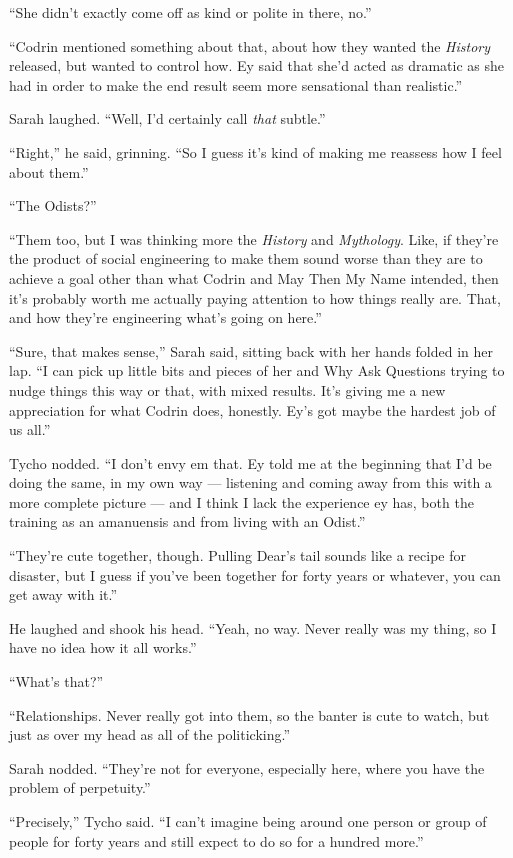 ``She didn't exactly come off as kind or polite in there, no.''

``Codrin mentioned something about that, about how they wanted the \emph{History} released, but wanted to control how. Ey said that she'd acted as dramatic as she had in order to make the end result seem more sensational than realistic.''

Sarah laughed. ``Well, I'd certainly call \emph{that} subtle.''

``Right,'' he said, grinning. ``So I guess it's kind of making me reassess how I feel about them.''

``The Odists?''

``Them too, but I was thinking more the \emph{History} and \emph{Mythology}. Like, if they're the product of social engineering to make them sound worse than they are to achieve a goal other than what Codrin and May Then My Name intended, then it's probably worth me actually paying attention to how things really are. That, and how they're engineering what's going on here.''

``Sure, that makes sense,'' Sarah said, sitting back with her hands folded in her lap. ``I can pick up little bits and pieces of her and Why Ask Questions trying to nudge things this way or that, with mixed results. It's giving me a new appreciation for what Codrin does, honestly. Ey's got maybe the hardest job of us all.''

Tycho nodded. ``I don't envy em that. Ey told me at the beginning that I'd be doing the same, in my own way — listening and coming away from this with a more complete picture — and I think I lack the experience ey has, both the training as an amanuensis and from living with an Odist.''

``They're cute together, though. Pulling Dear's tail sounds like a recipe for disaster, but I guess if you've been together for forty years or whatever, you can get away with it.''

He laughed and shook his head. ``Yeah, no way. Never really was my thing, so I have no idea how it all works.''

``What's that?''

``Relationships. Never really got into them, so the banter is cute to watch, but just as over my head as all of the politicking.''

Sarah nodded. ``They're not for everyone, especially here, where you have the problem of perpetuity.''

``Precisely,'' Tycho said. ``I can't imagine being around one person or group of people for forty years and still expect to do so for a hundred more.''

